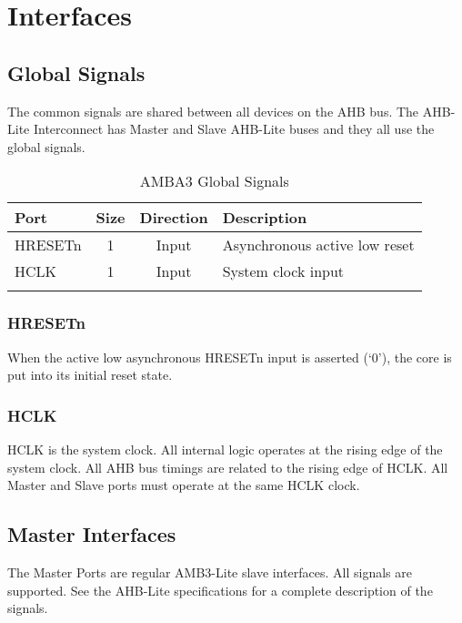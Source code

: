 \chapter{Interfaces}\label{interfaces}


\section{Global Signals}\label{global-signals}

The common signals are shared between all devices on the AHB bus. The
AHB-Lite Interconnect has Master and Slave AHB-Lite buses and they all
use the global signals.

\begin{longtable}[]{@{}lccl@{}}
\toprule
Port & Size & Direction & Description\tabularnewline
\midrule
\endhead
HRESETn & 1 & Input & Asynchronous active low reset\tabularnewline
HCLK & 1 & Input & System clock input\tabularnewline
\bottomrule
\caption{AMBA3 Global Signals}
\end{longtable}

\subsection{HRESETn}\label{hresetn}

When the active low asynchronous HRESETn input is asserted (`0'), the
core is put into its initial reset state.

\subsection{HCLK}\label{hclk}

HCLK is the system clock. All internal logic operates at the rising edge
of the system clock. All AHB bus timings are related to the rising edge
of HCLK. All Master and Slave ports must operate at the same HCLK clock.

\section{Master Interfaces}\label{master-interfaces}

The Master Ports are regular AMB3-Lite slave interfaces. All signals are
supported. See the AHB-Lite specifications for a complete description of
the signals.

